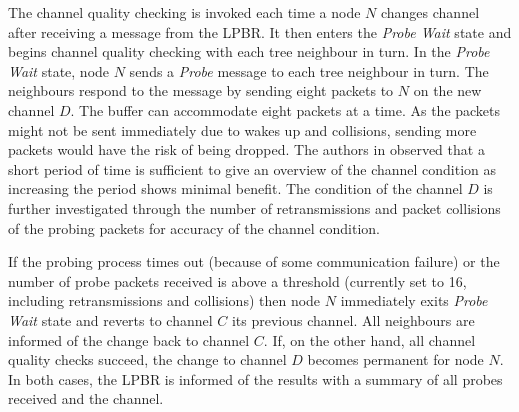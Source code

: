 The channel quality checking is invoked each time a node $N$ changes channel after receiving a message from the LPBR. 
It then enters the \emph{Probe Wait} state and begins channel quality checking with each tree neighbour in turn. 
In the \emph{Probe Wait} state, node $N$ sends a \emph{Probe} message to each tree neighbour in turn. The neighbours respond to the message by sending eight packets to $N$ on the new channel $D$. 
The buffer can accommodate eight packets at a time. As the packets might not be sent immediately due to wakes up and collisions, sending more packets would have the risk of being dropped. The authors in \cite{homearea} observed that a short period of time is sufficient to give an overview of the channel condition as increasing the period shows minimal benefit.
The condition of the channel $D$ is further investigated through the number of retransmissions and packet collisions of the probing packets for accuracy of the channel condition. 

If the probing process times out (because of some communication failure) or the number of probe packets received is above a threshold (currently set to 16, including retransmissions and collisions) then node $N$ immediately exits \emph{Probe Wait} state and reverts to channel $C$ its previous channel. 
All neighbours are informed of the change back to channel $C$.
If, on the other hand, all channel quality checks succeed, the change to channel $D$ becomes permanent for node $N$.
In both cases, the LPBR is informed of the results with a summary of all probes received and the channel.

